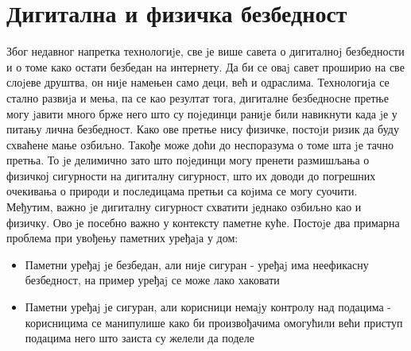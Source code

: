 \documentclass[a4paper]{article}
\begin{document}
\section{Дигитална и физичка безбедност}
Због недавног напретка технологиjе, све jе више савета о дигиталноj безбедности и о томе како остати безбедан на интернету. Да би се оваj
савет проширио на све слоjеве друштва, он ниjе намењен само деци, већ и одраслима. Технологиjа се стално развиjа и мења, па се као
резултат тога, дигиталне безбедносне претње могу jавити много брже него што су поjединци раниjе били навикнути када jе у питању лична
безбедност. Како ове претње нису физичке, постоjи ризик да буду схваћене мање озбиљно. Такође може доћи до неспоразума о томе шта jе
тачно претња. То jе делимично зато што поjединци могу пренети размишљања о физичкој сигурности на дигиталну сигурност, што их доводи
до погрешних очекивања о природи и последицама претњи са коjима се могу суочити.
\newline\newline
Међутим, важно jе дигиталну сигурност схватити jеднако озбиљно као и физичку. Ово jе посебно важно у контексту паметне куће.
Постоjе два примарна проблема при увођењу паметних уређаjа у дом:
\begin{itemize}
    \item Паметни уређаj jе безбедан, али ниjе сигуран - уређаj има неефикасну безбедност, на пример уређаj се може лако хаковати
    \item Паметни уређаj jе сигуран, али корисници немаjу контролу над подацима - корисницима се манипулише како би произвођачима
    омогућили већи приступ подацима него што заиста су желели да поделе
\end{itemize}
\end{document}
